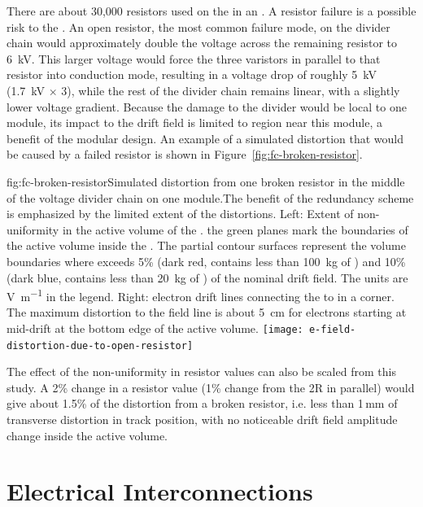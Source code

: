 There are about 30,000 resistors used on the  in an . A resistor failure is a possible risk to the .  
An open resistor, the most common failure mode, on the divider chain would approximately double the voltage across the remaining resistor to \SI{6}{kV}.  This larger voltage would force the three varistors in parallel to that resistor into conduction mode, resulting in a voltage drop of roughly \SI{5}{kV} (\SI{1.7}{kV} $\times$ \num{3}), while the rest of the divider chain remains linear, with a slightly lower voltage gradient. 
Because the damage to the divider would be local to one module, its impact to the  drift field is limited to region near this module, a benefit of the modular  design.
An example of a simulated \efield{} distortion that would be caused by a failed resistor is shown in Figure~\ref{fig:fc-broken-resistor}. 

\begin{dunefigure}{fig:fc-broken-resistor}{Simulated \efield{} distortion from one broken resistor in the middle of the voltage divider chain on one  module.The benefit of the redundancy scheme is emphasized by the limited extent of the \efield distortions. Left: Extent of \efield{} non-uniformity in the active volume of the . the green planes mark the boundaries of the active volume inside the . The partial contour surfaces represent the volume boundaries where \efield{} exceeds 5\% (dark red, contains less than \SI{100}{kg} of ) and 10\% (dark blue, contains less than \SI{20}{kg} of ) of the nominal drift field. The units are \si{\volt\per\m} in the legend. Right: electron drift lines connecting the  to  in a %
 corner.  The maximum distortion to the field line is about \SI{5}{cm} for electrons starting at mid-drift at the bottom edge of the active volume.}
\texttt{[image: e-field-distortion-due-to-open-resistor]}
\end{dunefigure}
The effect of the non-uniformity in resistor values can also be scaled from this study.  A 2\% change in a resistor value (1\% change from the 2R in parallel) would give about 1.5\% of the distortion from a broken resistor, i.e. less than 1\,mm of transverse distortion in track position, with no noticeable drift field amplitude change inside the active volume.
 
\section{Electrical Interconnections} %
\label{sec:fdsp-hv-design-interconnect}

